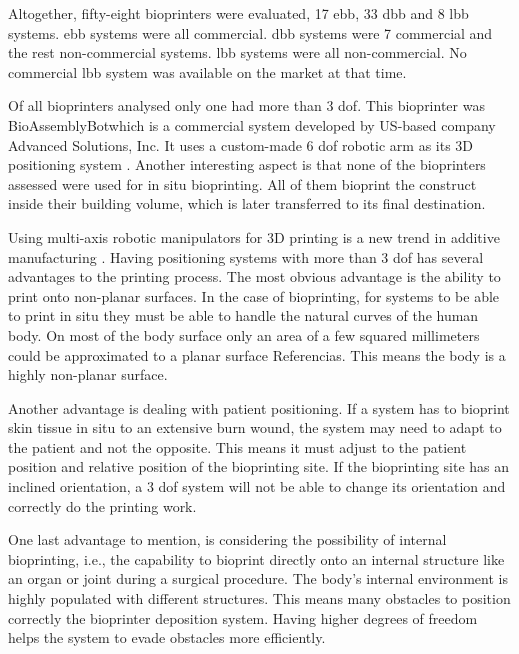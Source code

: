 Altogether, fifty-eight bioprinters were evaluated, 17 \gls{ebb}, 33 \gls{dbb} and 8 \gls{lbb} systems. \gls{ebb} systems were all commercial. \gls{dbb} systems were 7 commercial and the rest non-commercial systems. \gls{lbb} systems were all non-commercial. No commercial \gls{lbb} system was available on the market at that time.

Of all bioprinters analysed only one had more than 3 \gls{dof}. This bioprinter was BioAssemblyBot\textregistered which is a commercial system developed by US-based company Advanced Solutions, Inc. It uses a custom-made 6 \gls{dof} robotic arm as its 3D positioning system \cite{Advanced2020_bioassemblybot}. Another interesting aspect is that none of the bioprinters assessed were used for in situ bioprinting. All of them bioprint the construct inside their building volume, which is later transferred to its final destination.

Using multi-axis robotic manipulators for 3D printing is a new trend in additive manufacturing \cite{Urhal2019_robot_assisted_additive_manufacturing_review}. Having positioning systems with more than 3 \gls{dof} has several advantages to the printing process. The most obvious advantage is the ability to print onto non-planar surfaces. In the case of bioprinting, for systems to be able to print in situ they must be able to handle the natural curves of the human body. On most of the body surface only an area of a few squared millimeters could be approximated to a planar surface {\color{red} Referencias}. This means the body is a highly non-planar surface.

Another advantage is dealing with patient positioning. If a system has to bioprint skin tissue in situ to an extensive burn wound, the system may need to adapt to the patient and not the opposite. This means it must adjust to the patient position and relative position of the bioprinting site. If the bioprinting site has an inclined orientation, a 3 \gls{dof} system will not be able to change its orientation and correctly do the printing work.

One last advantage to mention, is considering the possibility of internal bioprinting, i.e., the capability to bioprint directly onto an internal structure like an organ or joint during a surgical procedure. The body's internal environment is highly populated with different structures. This means many obstacles to position correctly the bioprinter deposition system. Having higher degrees of freedom helps the system to evade obstacles more efficiently.

